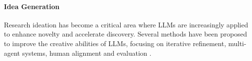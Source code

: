 \paragraph{Idea Generation} 
Research ideation has become a critical area where %
LLMs 
are increasingly %
applied to enhance novelty and accelerate discovery. Several methods have been proposed to improve the creative %
abilities 
of LLMs, %
focusing on iterative refinement, %
multi-agent systems, human alignment
and evaluation %
\cite{lu2024aiscientist, su2024two, radensky2024scideator, hu2024nova, li2024chain}. 



